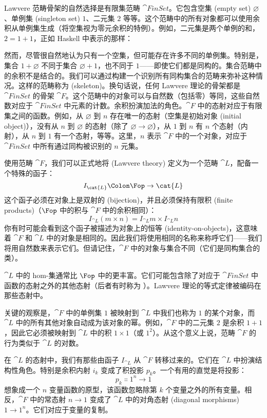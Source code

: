 Lawvere 范畴骨架的自然选择是有限集范畴 $\cat{FinSet}$。它包含空集 (empty set) $\varnothing$、单例集 (singleton set) $1$、二元集 $2$ 等等。这个范畴中的所有对象都可以使用余积从单例集生成（将空集视为零元余积的特例）。例如，二元集是两个单例的和，$2 = 1 + 1$，正如 Haskell 中表示的那样：

然而，尽管很自然地认为只有一个空集，但可能存在许多不同的单例集。特别是，集合 $1 + \varnothing$ 不同于集合 $\varnothing + 1$，也不同于 $1$——即使它们都是同构的。集合范畴中的余积不是结合的。我们可以通过构建一个识别所有同构集合的范畴来弥补这种情况。这样的范畴称为  (skeleton)。换句话说，任何 Lawvere 理论的骨架都是 $\cat{FinSet}$ 的骨架 $\cat{F}$。这个范畴中的对象可以与自然数（包括零）等同，这些自然数对应于 $\cat{FinSet}$ 中元素的计数。余积扮演加法的角色。$\cat{F}$ 中的态射对应于有限集之间的函数。例如，从 $\varnothing$ 到 $n$ 存在唯一的态射（空集是初始对象 (initial object)），没有从 $n$ 到 $\varnothing$ 的态射（除了 $\varnothing \to \varnothing$），从 $1$ 到 $n$ 有 $n$ 个态射（内射），从 $n$ 到 $1$ 有一个态射，等等。这里，$n$ 表示 $\cat{F}$ 中的一个对象，对应于 $\cat{FinSet}$ 中所有通过同构被识别的 $n$ 元集。

使用范畴 $\cat{F}$，我们可以正式地将  (Lawvere theory) 定义为一个范畴 $\cat{L}$，配备一个特殊的函子：
\[I_{\cat{L}} \Colon \Fop \to \cat{L}\]
这个函子必须在对象上是双射的 (bijection)，并且必须保持有限积 (finite products)（$\Fop$ 中的积与 $\cat{F}$ 中的余积相同）：
\[I_{\cat{L}} (m\times{}n) = I_{\cat{L}} m\times{}I_{\cat{L}} n\]
你有时可能会看到这个函子被描述为对象上的恒等 (identity-on-objects)，这意味着 $\cat{F}$ 和 $\cat{L}$ 中的对象是相同的。因此我们将使用相同的名称来称呼它们——我们将用自然数来表示它们。但请记住，$\cat{F}$ 中的对象与集合不同（它们是同构集合的类）。

$\cat{L}$ 中的 hom-集通常比 $\Fop$ 中的更丰富。它们可能包含除了对应于 $\cat{FinSet}$ 中函数的态射之外的其他态射（后者有时称为 ）。Lawvere 理论的等式定律被编码在那些态射中。

关键的观察是，$\cat{F}$ 中的单例集 $1$ 被映射到 $\cat{L}$ 中我们也称为 $1$ 的某个对象，而 $\cat{L}$ 中的所有其他对象自动成为该对象的幂。例如，$\cat{F}$ 中的二元集 $2$ 是余积 $1 + 1$，因此它必须被映射到 $\cat{L}$ 中的积 $1 \times 1$（或 $1^2$）。从这个意义上说，范畴 $\cat{F}$ 的行为类似于 $\cat{L}$ 的对数。

在 $\cat{L}$ 的态射中，我们有那些由函子 $I_{\cat{L}}$ 从 $\cat{F}$ 转移过来的。它们在 $\cat{L}$ 中扮演结构性角色。特别是余积内射 $i_k$ 变成了积投影 $p_k$。一个有用的直觉是将投影：
\[p_k \Colon 1^n \to 1\]
想象成一个 $n$ 变量函数的原型，该函数忽略除第 $k$ 个变量之外的所有变量。相反，$\cat{F}$ 中的常态射 $n \to 1$ 变成了 $\cat{L}$ 中的对角态射 (diagonal morphisms) $1 \to 1^n$。它们对应于变量的复制。


